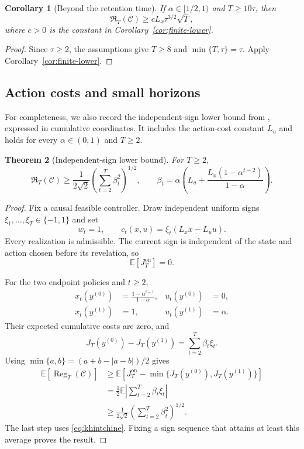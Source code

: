 \documentclass[11pt]{article}
\newtheorem{theorem}{Theorem}[section]
\newtheorem{corollary}[theorem]{Corollary}
\newcommand{\E}{\mathbb E}
\newcommand{\Reg}{\operatorname{Reg}}
\begin{document}
\begin{corollary}[Beyond the retention time]
\label{cor:retention}
If $\alpha\in[1/2,1)$ and $T\ge10\tau$, then
\begin{equation}
\label{eq:retention-lower}
\mathfrak R_T(\mathcal C)
\ge cL_x\tau^{3/2}\sqrt T,
\end{equation}
where $c>0$ is the constant in Corollary~\ref{cor:finite-lower}.
\end{corollary}

\begin{proof}
Since $\tau\ge2$, the assumptions give $T\ge8$ and
$\min\{T,\tau\}=\tau$. Apply Corollary~\ref{cor:finite-lower}.
\end{proof}

\subsection{Action costs and small horizons}

For completeness, we also record the independent-sign lower bound
from \cite{asgari2026sdac}, expressed in cumulative coordinates.
It includes the action-cost constant $L_u$ and holds for every
$\alpha\in(0,1)$ and $T\ge2$.

\begin{theorem}[Independent-sign lower bound]
\label{thm:sign}
For $T\ge2$,
\begin{equation}
\label{eq:sign-bound}
\mathfrak R_T(\mathcal C)
\ge
\frac1{2\sqrt2}
\left(\sum_{t=2}^T\beta_t^2\right)^{1/2},
\qquad
\beta_t=
\alpha\left(
L_u+\frac{L_x(1-\alpha^{t-2})}{1-\alpha}
\right).
\end{equation}
\end{theorem}

\begin{proof}
Fix a causal feasible controller.
Draw independent uniform signs
$\xi_1,\ldots,\xi_T\in\{-1,1\}$ and set
\[
w_t=1,
\qquad
c_t(x,u)=\xi_t(L_xx-L_uu).
\]
Every realization is admissible.
The current sign is independent of the state and action chosen
before its revelation, so
\[
\E[J_T^{\mathrm{on}}]=0.
\]

For the two endpoint policies and $t\ge2$,
\[
\begin{aligned}
x_t(y^{(0)})&=\frac{1-\alpha^{t-1}}{1-\alpha},
&
u_t(y^{(0)})&=0,\\
x_t(y^{(1)})&=1,
&
u_t(y^{(1)})&=\alpha.
\end{aligned}
\]
Their expected cumulative costs are zero, and
\[
J_T(y^{(0)})-J_T(y^{(1)})
=
\sum_{t=2}^T\beta_t\xi_t.
\]
Using $\min\{a,b\}=(a+b-|a-b|)/2$ gives
\begin{align*}
\E[\Reg_T(\mathcal C)]
&\ge
\E\left[
J_T^{\mathrm{on}}
-\min\{J_T(y^{(0)}),J_T(y^{(1)})\}
\right]\\
&=
\frac12\E\left|\sum_{t=2}^T\beta_t\xi_t\right|\\
&\ge
\frac1{2\sqrt2}
\left(\sum_{t=2}^T\beta_t^2\right)^{1/2}.
\end{align*}
The last step uses \eqref{eq:khintchine}.
Fixing a sign sequence that attains at least this average
proves the result.
\end{proof}
\end{document}
